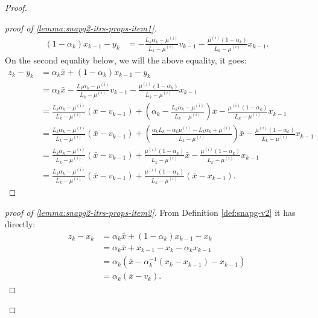 \documentclass[12pt]{article}
\begin{document}
\begin{proof}
\begin{proof}[proof of \ref{lemma:snapg2-itrs-props-item1}]
                \begin{align*}
                    (1 - \alpha_k)x_{k - 1} - y_k &= 
                    - \frac{L_k\alpha_k - \mu^{(i)}}{L_k - \mu^{(i)}} v_{k - 1} 
                    - \frac{\mu^{(i)}(1 - \alpha_k)}{L_k - \mu^{(i)}} x_{k - 1}. 
                \end{align*}
                On the second equality below, we will the above equality, it goes: 
                \begin{align*}
                    z_k - y_k &= 
                    \alpha_k \bar x + (1 - \alpha_k)x_{k - 1} - y_k
                    \\
                    &= \alpha_k \bar x 
                    - \frac{L_k\alpha_k - \mu^{(i)}}{L_k - \mu^{(i)}} v_{k - 1} 
                    - \frac{\mu^{(i)}(1 - \alpha_k)}{L_k - \mu^{(i)}} x_{k - 1}
                    \\
                    &= \frac{L_k\alpha_k - \mu^{(i)}}{L_k - \mu^{(i)}}(\bar x - v_{k - 1})
                    + \left(
                        \alpha_k - \frac{L_k\alpha_k - \mu^{(i)}}{L_k - \mu^{(i)}}
                    \right)\bar x
                    - \frac{\mu^{(i)}(1 - \alpha_k)}{L_k - \mu^{(i)}} x_{k - 1}
                    \\
                    &= \frac{L_k\alpha_k - \mu^{(i)}}{L_k - \mu^{(i)}}(\bar x - v_{k - 1})
                    + \left(
                        \frac{\alpha_kL_k - \alpha_k \mu^{(i)} - L_k\alpha_k + \mu^{(i)}}{L_k - \mu^{(i)}}
                    \right)\bar x
                    - \frac{\mu^{(i)}(1 - \alpha_k)}{L_k - \mu^{(i)}} x_{k - 1}
                    \\
                    &= \frac{L_k\alpha_k - \mu^{(i)}}{L_k - \mu^{(i)}}(\bar x - v_{k - 1})
                    + \frac{\mu^{(i)}(1 - \alpha_k)}{L_k - \mu^{(i)}}\bar x
                    - \frac{\mu^{(i)}(1 - \alpha_k)}{L_k - \mu^{(i)}} x_{k - 1}
                    \\
                    &= \frac{L_k\alpha_k - \mu^{(i)}}{L_k - \mu^{(i)}}(\bar x - v_{k - 1})
                    + \frac{\mu^{(i)}(1 - \alpha_k)}{L_k - \mu^{(i)}}(\bar x - x_{k - 1}).
                \end{align*}
            \end{proof}
            \begin{proof}[proof of \ref{lemma:snapg2-itrs-props-item2}]
                From Definition \ref{def:snapg-v2} it has directly: 
                \begin{align*}
                    z_k - x_k &= \alpha_k \bar x + (1 - \alpha_k)x_{k - 1} - x_k
                    \\
                    &= \alpha_k \bar x + x_{k - 1} - x_k - \alpha_k x_{k - 1}
                    \\
                    &= \alpha_k(\bar x - \alpha_k^{-1}(x_k - x_{k - 1}) - x_{k - 1})
                    \\
                    &= \alpha_k (\bar x - v_k).
                \end{align*}
            \end{proof}
        \end{proof}
\end{document}

